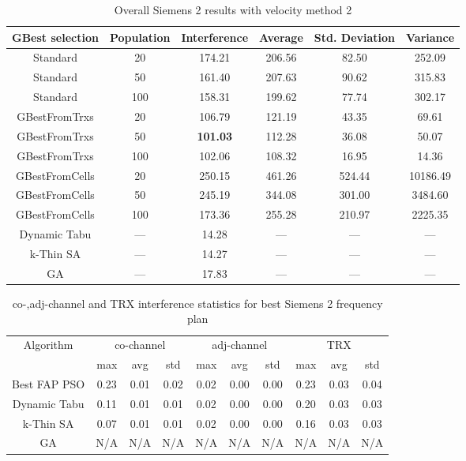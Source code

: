 \begin{table}[H]
\centering
	\begin{tabular}{cccccc}
	\toprule
    GBest selection & Population & Interference & Average & Std. Deviation & Variance \\
    \midrule
    Standard & 20 & 174.21 & 206.56 &  82.50 & 252.09\\
    Standard & 50 & 161.40 & 207.63 &  90.62 & 315.83\\
    Standard & 100 & 158.31 & 199.62 &  77.74 & 302.17\\
    GBestFromTrxs & 20 & 106.79 & 121.19 &  43.35 &  69.61\\
    GBestFromTrxs & 50 & \textbf{101.03} & 112.28 &  36.08 &  50.07\\
    GBestFromTrxs & 100 & 102.06 & 108.32 &  16.95 &  14.36\\
    GBestFromCells & 20 & 250.15 & 461.26 & 524.44 & 10186.49\\
    GBestFromCells & 50 & 245.19 & 344.08 & 301.00 & 3484.60\\
    GBestFromCells & 100 & 173.36 & 255.28 & 210.97 & 2225.35\\
    \midrule
    Dynamic Tabu & --- & 14.28 & --- & --- & --- \\
    k-Thin SA & --- & 14.27 & --- & --- & --- \\
    GA & --- & 17.83 & --- & --- & --- \\
    \bottomrule
	\end{tabular}
\caption{Overall Siemens 2 results with velocity method 2}
\label{tab:siem2m2}
\end{table}
\begin{table}[H]
\centering
	\begin{tabular}{cccccccccc}
	\toprule
    Algorithm & \multicolumn{3}{c}{co-channel} & \multicolumn{3}{c}{adj-channel} & \multicolumn{3}{c}{TRX}\\
              & max & avg & std
              & max & avg & std
              & max & avg & std\\
    \midrule
    Best FAP PSO & 0.23 & 0.01 & 0.02 & 0.02 & 0.00 & 0.00 & 0.23 & 0.03 & 0.04 \\
    Dynamic Tabu & 0.11 & 0.01 & 0.01 & 0.02 & 0.00 & 0.00 & 0.20 & 0.03 & 0.03\\
    k-Thin SA & 0.07 & 0.01 & 0.01 & 0.02 & 0.00 & 0.00 & 0.16 & 0.03 & 0.03\\
    GA & \scriptsize{N/A} & \scriptsize{N/A} & \scriptsize{N/A} & \scriptsize{N/A} & \scriptsize{N/A} & \scriptsize{N/A} & \scriptsize{N/A} & \scriptsize{N/A} & \scriptsize{N/A}\\
    \bottomrule
	\end{tabular}
\caption{co-,adj-channel and TRX interference statistics for best Siemens 2 frequency plan}
\label{tab:stats-siem2m1}
\end{table}
